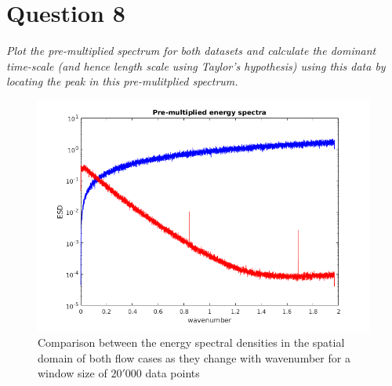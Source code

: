 \section*{Question 8}
\textit{Plot the pre-multiplied spectrum for both datasets and calculate the dominant time-scale (and hence length scale using Taylor’s hypothesis) using this data by locating the peak in this pre-mulitplied spectrum.}

\begin{figure}[!ht]
\centering
\includegraphics[scale=0.8]{./TEXT/esd-n.png}
\caption{Comparison between the energy spectral densities in the spatial domain of both flow cases as they change with wavenumber for a window size of $20'000$ data points}
\label{esd-n}
\end{figure}